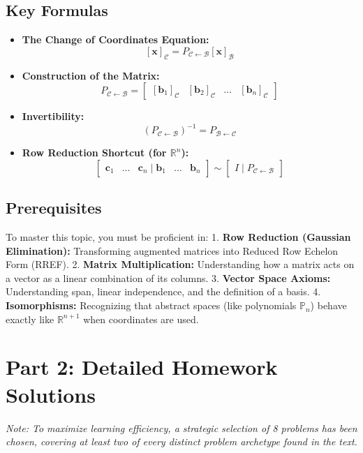 \documentclass[11pt]{article}
\begin{document}
\subsection{Key Formulas}
\begin{itemize}
    \item \textbf{The Change of Coordinates Equation:} 
    \[ [\mathbf{x}]_{\mathcal{C}} = P_{\mathcal{C} \leftarrow \mathcal{B}} [\mathbf{x}]_{\mathcal{B}} \]
    \item \textbf{Construction of the Matrix:} 
    \[ P_{\mathcal{C} \leftarrow \mathcal{B}} = \begin{bmatrix} [\mathbf{b}_1]_{\mathcal{C}} & [\mathbf{b}_2]_{\mathcal{C}} & \dots & [\mathbf{b}_n]_{\mathcal{C}} \end{bmatrix} \]
    \item \textbf{Invertibility:} 
    \[ (P_{\mathcal{C} \leftarrow \mathcal{B}})^{-1} = P_{\mathcal{B} \leftarrow \mathcal{C}} \]
    \item \textbf{Row Reduction Shortcut (for $\mathbb{R}^n$):} 
    \[ \begin{bmatrix} \mathbf{c}_1 & \dots & \mathbf{c}_n \mid \mathbf{b}_1 & \dots & \mathbf{b}_n \end{bmatrix} \sim \begin{bmatrix} I \mid P_{\mathcal{C} \leftarrow \mathcal{B}} \end{bmatrix} \]
\end{itemize}

\subsection{Prerequisites}
To master this topic, you must be proficient in:
1. \textbf{Row Reduction (Gaussian Elimination):} Transforming augmented matrices into Reduced Row Echelon Form (RREF).
2. \textbf{Matrix Multiplication:} Understanding how a matrix acts on a vector as a linear combination of its columns.
3. \textbf{Vector Space Axioms:} Understanding span, linear independence, and the definition of a basis.
4. \textbf{Isomorphisms:} Recognizing that abstract spaces (like polynomials $\mathbb{P}_n$) behave exactly like $\mathbb{R}^{n+1}$ when coordinates are used.

\section{Part 2: Detailed Homework Solutions}
\textit{Note: To maximize learning efficiency, a strategic selection of 8 problems has been chosen, covering at least two of every distinct problem archetype found in the text.}
\end{document}
